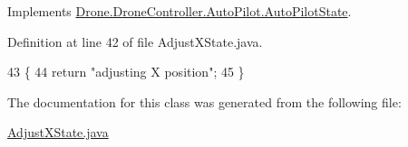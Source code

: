 Implements \hyperlink{interface_drone_1_1_drone_controller_1_1_auto_pilot_1_1_auto_pilot_state_ac30fcebfe95c80d2d66d44dc7d46ebc3}{Drone.\+Drone\+Controller.\+Auto\+Pilot.\+Auto\+Pilot\+State}.



Definition at line 42 of file Adjust\+X\+State.\+java.


\begin{DoxyCode}
43     \{
44         \textcolor{keywordflow}{return} \textcolor{stringliteral}{"adjusting X position"};
45     \}
\end{DoxyCode}


The documentation for this class was generated from the following file\+:\begin{DoxyCompactItemize}
\item 
\hyperlink{_adjust_x_state_8java}{Adjust\+X\+State.\+java}\end{DoxyCompactItemize}
